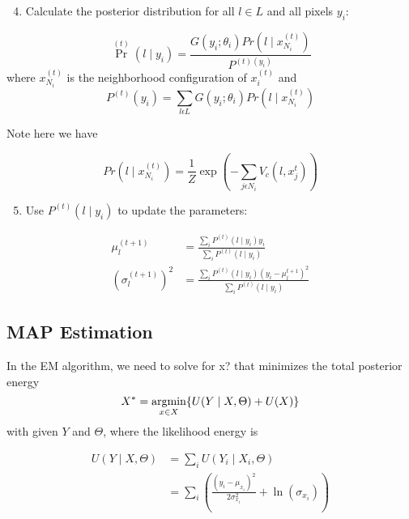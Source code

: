 \begin{enumerate}
	\setcounter{enumi}{3}
	\item Calculate the posterior distribution for all  \(l \in L\) and  all pixels \(y_i\):
\end{enumerate}
\begin{equation}
\Pr^{(t)}(l \mid y_i)=\frac{G(y_i;\theta_i)Pr(l \mid x^{(t)}_{N_i})}{P^{(t)(y_i)}}
\end{equation}
where \(x^{(t)}_{N_i}\) is the neighborhood configuration of \(x^{(t)}_i\)
and
\begin{equation}
P^{(t)}(y_i)={\sum\limits_{l \epsilon L} }G(y_i;\theta_i)Pr(l \mid x^{(t)}_{N_i})
\end{equation}

Note here we have

\begin{equation}
Pr(l \mid x^{(t)}_{N_i})=\frac{1}{Z}\exp(-{\sum\limits_{j \epsilon N_i}}V_c(l,x^t_j))
\end{equation}

\begin{enumerate}
	\setcounter{enumi}{4}
	\item Use \(P^{(t)}(l \mid y_i)\) to update the parameters: 
\end{enumerate}

\begin{equation}
\begin{split}
\mu^{(t+1)}_l & = \frac{{\sum\limits_{i}}P^{(t)}(l \mid y_i)y_i}{{\sum\limits_{i}}P^{(t)}(l \mid y_i)} \\
(\sigma^{(t+1)}_l)^2 & =\frac{{\sum\limits_{i}}P^{(t)}(l \mid y_i)(y_i-\mu^{t+1}_l)^2}{{\sum\limits_{i}}P^{(t)}(l \mid y_i)}
\end{split}
\end{equation}

\subsection{MAP Estimation}
In the EM algorithm, we need to solve for x? that minimizes
the total posterior energy
\begin{equation}\label{eq:MAp}
X^* = \operatorname*{argmin}_{x \in X} \{U( Y \mid X, \Theta) + U(X)\}
\end{equation}
with given $Y$ and $\Theta$, where the likelihood energy is

\begin{equation}
\begin{split}
U( Y \mid X, \Theta) & ={\sum\limits_{i}}U( Y_i \mid X_i, \Theta)\\
& = {\sum\limits_{i}}(\frac{(y_i-\mu_{x_i})^2}{2\sigma_{x_i}^2} + \ln(\sigma_{x_i}))
\end{split}
\end{equation}

